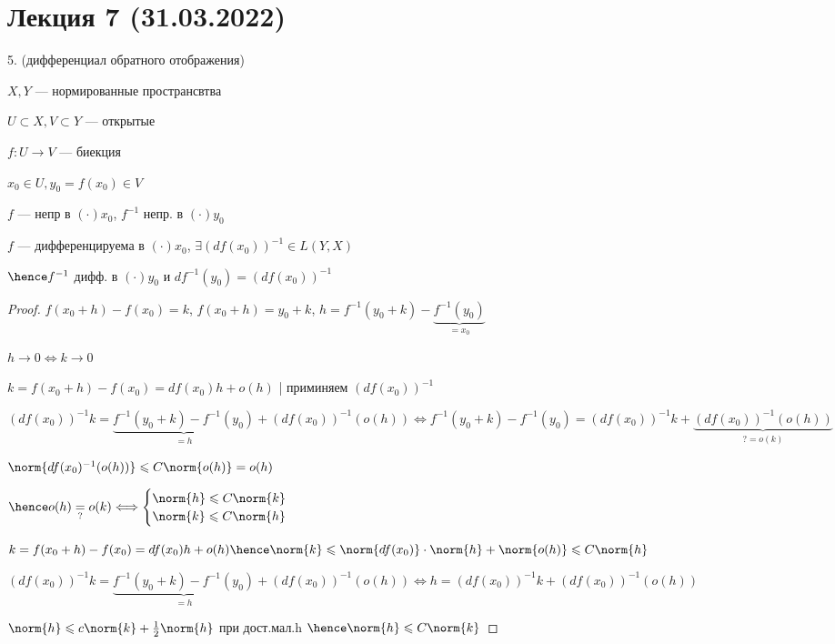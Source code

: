 \section*{Лекция 7 (31.03.2022)}

5. (дифференциал обратного отображения)


$X, Y$ --- нормированные пространсвтва

$U \subset X, V \subset Y$ --- открытые

$f: U \to V$ --- биекция

$x_0 \in U, y_0 = f(x_0) \in V$

$f $ --- непр в $(\cdot) x_0$, $f^{-1}$ непр. в $(\cdot) y_0$

$f$ --- дифференцируема в $(\cdot)x_0$, $\exists (df(x_0))^{-1} \in L(Y, X)$

$\hence f^{-1}$ дифф. в $(\cdot) y_0$ и $df^{-1}(y_0) = (df(x_0))^{-1}$


\begin{proof}
    $f(x_0 + h) - f(x_0) = k$, $f(x_0 + h) = y_0 + k$, $h = f^{-1}(y_0 + k) - \underbrace{f^{-1}(y_0)}_{=x_0}$

    $h \to 0 \Longleftrightarrow k \to 0$

    $k = f(x_0 + h) - f(x_0) = df(x_0)h + o(h)$ | приминяем $(df(x_0))^{-1}$

    $(df(x_0))^{-1} k = \underbrace{f^{-1}(y_0 + k) - f^{-1}(y_0)}_{=h} + (df(x_0))^{-1}(o(h)) \Longleftrightarrow f^{-1}(y_0 + k) - f^{-1}(y_0) = (df(x_0)) ^ {-1} k + \underbrace{(df(x_0))^{-1}(o(h))}_{?= o(k)}$

    $\norm{df(x_0)^{-1}(o(h))} \leqslant C \norm{o(h)} = o(h)$

    $\hence o(h) \underset{?}{=} o(k) \Longleftrightarrow \begin{cases}
        \norm{h} \leqslant C \norm{k} \\
        \norm{k} \leqslant C\norm{h}
    \end{cases}$

    $k = f(x_0 + h) - f(x_0) = df(x_0)h + o(h) \hence \norm{k} \leqslant \norm{df(x_0)} \cdot \norm{h} + \norm{o(h)} \leqslant C \norm{h}$

    $(df(x_0))^{-1} k = \underbrace{f^{-1}(y_0 + k) - f^{-1}(y_0)}_{=h} + (df(x_0))^{-1}(o(h)) \Longleftrightarrow h = (df(x_0))^{-1}k + (df(x_0))^{-1}(o(h))$

    $\norm{h} \leqslant c \norm{k} + \frac{1}{2}\norm{h}$ при дост.мал.h $\hence \norm{h} \leqslant C \norm{k}$
\end{proof}
\newpage

